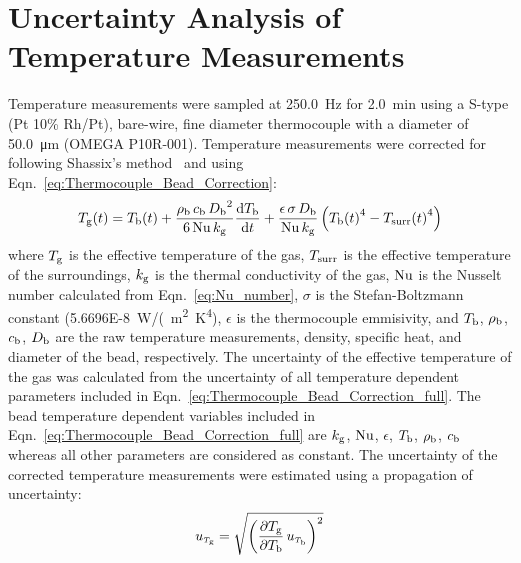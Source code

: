 \documentclass[12pt]{article}
\begin{document}
\pagebreak

\section{Uncertainty Analysis of Temperature Measurements}\label{sec:Uncertainty_Temperature_Measurements}

Temperature measurements were sampled at \SI{250.0}{Hz} for \SI{2.0}{min} using a S-type (Pt 10\% Rh/Pt), bare-wire, fine diameter thermocouple with a diameter of \SI{50.0}{\micro\metre} (OMEGA P10R-001). Temperature measurements were corrected for following Shassix's method~\cite{Shaddix1999} and using Eqn.~\ref{eq:Thermocouple_Bead_Correction}:
\begin{equation}\label{eq:Thermocouple_Bead_Correction_full}
{T_{\rm g}(t)}= T_{\rm b}(t)+{\frac{\rho_{\rm b} \, c_{\rm b} \, {D_{\rm b}}^2}{6\, {\rm Nu} \, k_{\rm g}}}\frac{{\rm d} T_{\rm b}}{{\rm d} t}+\frac{\epsilon \, \sigma \, D_{\rm b}}{{\rm Nu} \, k_{\rm g}}\left({T_{\rm b}(t)}^4-{T_{\rm surr}(t)}^4\right)
\end{equation}
where $T_{\rm g}$ is the effective temperature of the gas, $T_{\rm surr}$ is the effective temperature of the surroundings, $k_{\rm g}$ is the thermal conductivity of the gas, $\rm Nu$ is the Nusselt number calculated from Eqn.~\ref{eq:Nu_number}, $\sigma$ is the Stefan-Boltzmann constant (\SI{5.6696E-8}{W/(m^2~K^4}), $\epsilon$ is the thermocouple emmisivity, and $T_{\rm b}$, $\rho_{\rm b}$, $c_{\rm b}$, $D_{\rm b}$ are the raw temperature measurements, density, specific heat, and diameter of the bead, respectively. The uncertainty of the effective temperature of the gas was calculated from the uncertainty of all temperature dependent parameters included in Eqn.~\ref{eq:Thermocouple_Bead_Correction_full}. The bead temperature dependent variables included in Eqn.~\ref{eq:Thermocouple_Bead_Correction_full} are $k_{\rm g}$, $\rm Nu$, $\epsilon$, $T_{\rm b}$, $\rho_{\rm b}$, $c_{\rm b}$ whereas all other parameters are considered as constant. The uncertainty of the corrected temperature measurements were estimated using a propagation of uncertainty:
 \begin{equation}
\label{eq:temperature_corr_uncer}
u_{\scriptscriptstyle T_{\rm g}} = \sqrt{{\left(\frac{\partial T_{\rm g}}{\partial T_{\rm b}}\,u_{\scriptscriptstyle T_{\rm b}} \right)}^2}
\end{equation}
\end{document}
